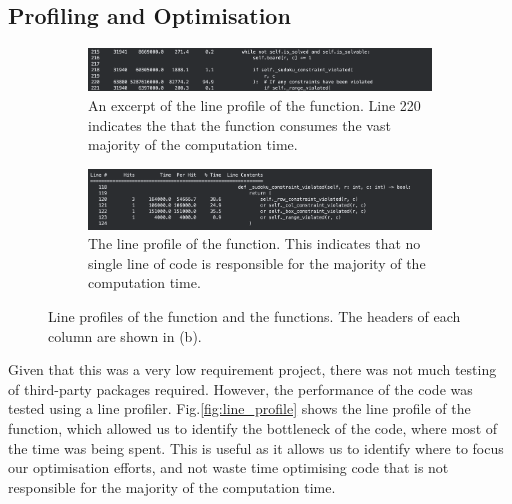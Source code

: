     \subsection{Profiling and Optimisation}\label{subsec:profiling-and-optimisation}
    \begin{figure}[htb]
    \centering
    \begin{subfigure}[b]{0.9\linewidth}
        \includegraphics[width=\linewidth]{figures/line_profile1}
        \caption{An excerpt of the line profile of the  function. Line 220 indicates
        the that the  function consumes the vast majority of the
        computation time.}
    \end{subfigure}
    \hfill
    \begin{subfigure}[b]{0.9\linewidth}
        \includegraphics[width=\linewidth]{figures/line_profile2}
        \caption{The line profile of the  function. This indicates
        that no single line of code is responsible for the majority of the computation time.}
    \end{subfigure}
    \caption{Line profiles of the  function and the
     functions. The headers of each column are shown in (b).}
    \label{fig:line_profile}
    \end{figure}
    Given that this was a very low requirement project, there was not much testing of third-party packages required.
    However, the performance of the code was tested using a line profiler.
    Fig.\eqref{fig:line_profile} shows the line profile of the  function, which allowed
    us to identify the bottleneck of the code, where most of the time was being spent.
    This is useful as it allows us to identify where to focus our optimisation efforts, and not waste time optimising
    code that is not responsible for the majority of the computation time.

